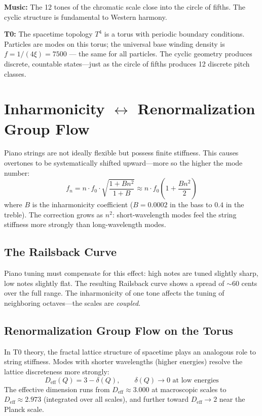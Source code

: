 \textbf{Music:} The 12 tones of the chromatic scale close into the circle of fifths. The cyclic structure is fundamental to Western harmony.

\textbf{T0:} The spacetime topology $T^4$ is a torus with periodic boundary conditions. Particles are modes on this torus; the universal base winding density is $f = 1/(4\xi) = 7500$ — the same for all particles. The cyclic geometry produces discrete, countable states---just as the circle of fifths produces 12 discrete pitch classes.

\section{\texorpdfstring{Inharmonicity $\leftrightarrow$ Renormalization Group Flow}{Inharmonicity -- Renormalization Group Flow}}

Piano strings are not ideally flexible but possess finite stiffness. This causes overtones to be systematically shifted upward---more so the higher the mode number:
\begin{equation}
	f_n = n \cdot f_0 \cdot \sqrt{\frac{1 + B n^2}{1 + B}} \approx n \cdot f_0 \left(1 + \frac{B n^2}{2}\right)
\end{equation}
where $B$ is the inharmonicity coefficient ($B = 0.0002$ in the bass to $0.4$ in the treble). The correction grows as $n^2$: short-wavelength modes feel the string stiffness more strongly than long-wavelength modes.

\subsection{The Railsback Curve}

Piano tuning must compensate for this effect: high notes are tuned slightly sharp, low notes slightly flat. The resulting Railsback curve shows a spread of $\sim$60 cents over the full range. The inharmonicity of one tone affects the tuning of neighboring octaves---the scales are \emph{coupled}.

\subsection{Renormalization Group Flow on the Torus}

In T0 theory, the fractal lattice structure of spacetime plays an analogous role to string stiffness. Modes with shorter wavelengths (higher energies) resolve the lattice discreteness more strongly:
\begin{equation}
	D_\text{eff}(Q) = 3 - \delta(Q), \qquad \delta(Q) \to 0 \text{ at low energies}
\end{equation}
The effective dimension runs from $D_\text{eff} \approx 3.000$ at macroscopic scales to $D_\text{eff} \approx 2.973$ (integrated over all scales), and further toward $D_\text{eff} \to 2$ near the Planck scale.

